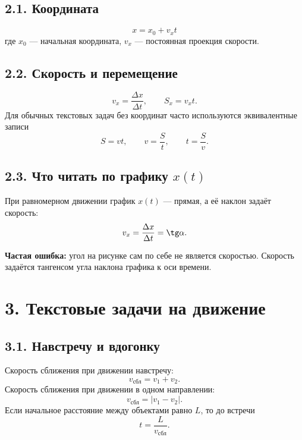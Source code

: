 \documentclass[a4paper,12pt]{article}
\newcommand{\warntext}[1]{\textbf{\color{warn}#1}}
\newcommand{\formula}[1]{\[\displaystyle #1\]}
\begin{document}
\subsection*{2.1. Координата}
\formula{\boxed{x=x_0+v_xt}}
где $x_0$ --- начальная координата, $v_x$ --- постоянная проекция скорости.

\subsection*{2.2. Скорость и перемещение}
\formula{v_x=\frac{\Delta x}{\Delta t}, \qquad S_x=v_xt.}
Для обычных текстовых задач без координат часто используются эквивалентные записи
\formula{S=vt, \qquad v=\frac{S}{t}, \qquad t=\frac{S}{v}.}

\subsection*{2.3. Что читать по графику $x(t)$}
При равномерном движении график $x(t)$ --- прямая, а её наклон задаёт скорость:
\formula{v_x=\frac{\Delta x}{\Delta t}=\tg\alpha.}

\begin{center}
\end{center}

\warntext{Частая ошибка:} угол на рисунке сам по себе не является скоростью. Скорость задаётся тангенсом угла наклона графика к оси времени.

\normalsize
\clearpage

\section*{3. Текстовые задачи на движение}
\small

\subsection*{3.1. Навстречу и вдогонку}
Скорость сближения при движении навстречу:
\formula{v_{\text{сбл}}=v_1+v_2.}
Скорость сближения при движении в одном направлении:
\formula{v_{\text{сбл}}=|v_1-v_2|.}
Если начальное расстояние между объектами равно $L$, то до встречи
\formula{t=\frac{L}{v_{\text{сбл}}}.}
\end{document}
